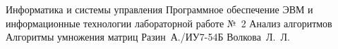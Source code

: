 \documentclass{bmstu}[a4paper]
\begin{document}
	
	\makereporttitle
	{Информатика и системы управления} %
	{Программное обеспечение ЭВМ и информационные технологии} %
	{лабораторной работе №~2} %
	{Анализ алгоритмов} %
	{Алгоритмы умножения матриц} %
	{} %
	{Разин~А./ИУ7-54Б} %
	{Волкова~Л.~Л.} %
	
	\maketableofcontents
	
	
	
	
	
	
	
	
	
	\makebibliography
	
	
	
	
\end{document}
